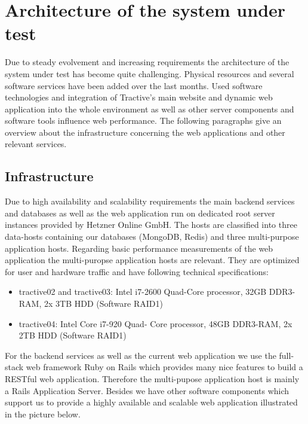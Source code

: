 \chapter{Architecture of the system under test}
\label{chap:architecture}

Due to steady evolvement and increasing requirements the architecture of the system under test has become quite challenging. Physical resources and several software services have been added over the last months. Used software technologies and integration of Tractive's main website and dynamic web application into the whole environment as well as other server components and software tools influence web performance. The following paragraphs give an overview about the infrastructure concerning the web applications and other relevant services.

\section{Infrastructure}
Due to high availability and scalability requirements the main backend services and databases as well as the web application run on dedicated root server instances provided by Hetzner Online GmbH. The hosts are classified into three data-hosts containing our databases (MongoDB, Redis) and three multi-purpose application hosts. Regarding basic performance measurements of the web application the multi-puropse application hosts are relevant. They are optimized for user and hardware traffic and have following technical specifications:

\begin{itemize}
	\item{tractive02 and tractive03}: Intel i7-2600 Quad-Core processor, 32GB DDR3-RAM, 2x 3TB HDD (Software RAID1)
	\item{tractive04}: Intel Core i7-920 Quad- Core processor, 48GB DDR3-RAM, 2x 2TB HDD (Software RAID1)
\end{itemize}

For the backend services as well as the current web application we use the full-stack web framework Ruby on Rails which provides many nice features to build a RESTful web application. Therefore the multi-pupose application host is mainly a Rails Application Server. Besides we have other software components which support us to provide a highly available and scalable web application illustrated in the picture below. 

